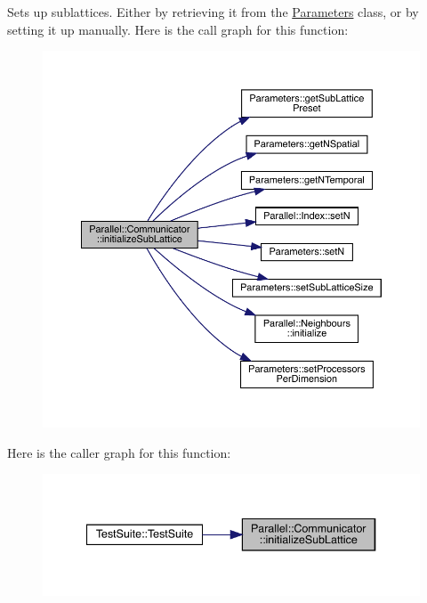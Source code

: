 Sets up sublattices. Either by retrieving it from the \mbox{\hyperlink{class_parameters}{Parameters}} class, or by setting it up manually. Here is the call graph for this function\+:
\nopagebreak
\begin{figure}[H]
\begin{center}
\leavevmode
\includegraphics[width=350pt]{class_parallel_1_1_communicator_a3094d713d09225738ecf0250019db115_cgraph}
\end{center}
\end{figure}
Here is the caller graph for this function\+:
\nopagebreak
\begin{figure}[H]
\begin{center}
\leavevmode
\includegraphics[width=340pt]{class_parallel_1_1_communicator_a3094d713d09225738ecf0250019db115_icgraph}
\end{center}
\end{figure}
\mbox{\label{class_parallel_1_1_communicator_a57bb28ee8dbc4efd708a2695423778c4}} 
